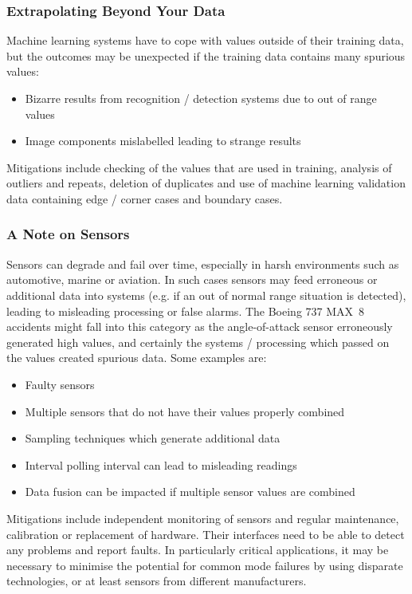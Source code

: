 \subsubsection{Extrapolating Beyond Your Data}
Machine learning systems have to cope with values outside of their training data, but the outcomes may be unexpected if the training data contains many spurious values:
\begin{itemize}
    \item Bizarre results from recognition / detection systems due to out of range values
    \item Image components mislabelled leading to strange results
\end{itemize}

Mitigations include checking of the values that are used in training, analysis of outliers and repeats, deletion of duplicates and use of machine learning validation data containing edge / corner cases and boundary cases.

\subsubsection{A Note on Sensors}
Sensors can degrade and fail over time, especially in harsh environments such as automotive, marine or aviation. In such cases sensors may feed erroneous or additional data into systems (e.g. if an out of normal range situation is detected), leading to misleading processing or false alarms. The Boeing 737 MAX~8 accidents might fall into this category as the angle-of-attack sensor erroneously generated high values, and certainly the systems / processing which passed on the values created spurious data. Some examples are:
\begin{itemize}
    \item Faulty sensors
    \item Multiple sensors that do not have their values properly combined
    \item Sampling techniques which generate additional data
    \item Interval polling interval can lead to misleading readings
    \item Data fusion can be impacted if multiple sensor values are combined
\end{itemize}

Mitigations include independent monitoring of sensors and regular maintenance, calibration or replacement of hardware. Their interfaces need to be able to detect any problems and report faults. In particularly critical applications, it may be necessary to minimise the potential for common mode failures by using disparate technologies, or at least sensors from different manufacturers.

